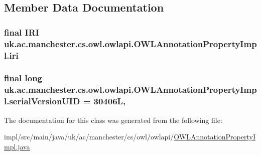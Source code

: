 \subsection{Member Data Documentation}
\hypertarget{classuk_1_1ac_1_1manchester_1_1cs_1_1owl_1_1owlapi_1_1_o_w_l_annotation_property_impl_a9fbc4239078f8a5871b59af92c235b0a}{
\subsubsection[{iri}]{\setlength{\rightskip}{0pt plus 5cm}final {\bf I\-R\-I} uk.\-ac.\-manchester.\-cs.\-owl.\-owlapi.\-O\-W\-L\-Annotation\-Property\-Impl.\-iri\hspace{0.3cm}{\ttfamily [private]}}}\label{classuk_1_1ac_1_1manchester_1_1cs_1_1owl_1_1owlapi_1_1_o_w_l_annotation_property_impl_a9fbc4239078f8a5871b59af92c235b0a}
\hypertarget{classuk_1_1ac_1_1manchester_1_1cs_1_1owl_1_1owlapi_1_1_o_w_l_annotation_property_impl_ab22604a5a24eb1c1dca1722d04ea4f7d}{
\subsubsection[{serial\-Version\-U\-I\-D}]{\setlength{\rightskip}{0pt plus 5cm}final long uk.\-ac.\-manchester.\-cs.\-owl.\-owlapi.\-O\-W\-L\-Annotation\-Property\-Impl.\-serial\-Version\-U\-I\-D = 30406\-L\hspace{0.3cm}{\ttfamily [static]}, {\ttfamily [private]}}}\label{classuk_1_1ac_1_1manchester_1_1cs_1_1owl_1_1owlapi_1_1_o_w_l_annotation_property_impl_ab22604a5a24eb1c1dca1722d04ea4f7d}


The documentation for this class was generated from the following file\-:\begin{DoxyCompactItemize}
\item 
impl/src/main/java/uk/ac/manchester/cs/owl/owlapi/\hyperlink{_o_w_l_annotation_property_impl_8java}{O\-W\-L\-Annotation\-Property\-Impl.\-java}\end{DoxyCompactItemize}
